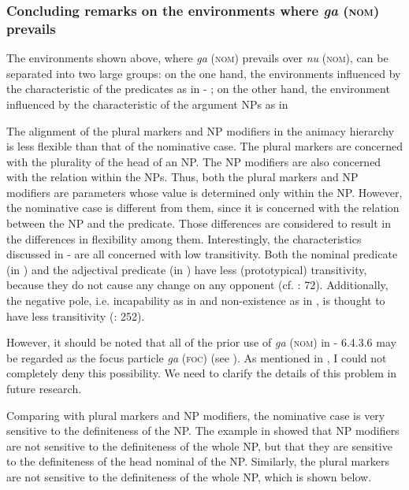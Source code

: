 \begin{styleBeschriftung}
\subsubsection{Concluding remarks on the environments where \textit{ga} (\textsc{nom}) prevails}

The environments shown above, where \textit{ga} (\textsc{nom}) prevails over \textit{nu} (\textsc{nom}), can be separated into two large groups: on the one hand, the environments influenced by the characteristic of the predicates as in  - ; on the other hand, the environment influenced by the characteristic of the argument NPs as in 

The alignment of the plural markers and NP modifiers in the animacy hierarchy is less flexible than that of the nominative case. The plural markers are concerned with the plurality of the head of an NP. The NP modifiers are also concerned with the relation within the NPs. Thus, both the plural markers and NP modifiers are parameters whose value is determined only within the NP. However, the nominative case is different from them, since it is concerned with the relation between the NP and the predicate. Those differences are considered to result in the differences in flexibility among them. Interestingly, the characteristics discussed in  -  are all concerned with low transitivity. Both the nominal predicate (in ) and the adjectival predicate (in ) have less (prototypical) transitivity, because they do not cause any change on any opponent (cf. \citealt{Tsunoda1991}: 72). Additionally, the negative pole, i.e. incapability as in  and non-existence as in , is thought to have less transitivity (\citealt{HopperThompson1980}: 252).

However, it should be noted that all of the prior use of \textit{ga} (\textsc{nom}) in  - 6.4.3.6 may be regarded as the focus particle \textit{ga} (\textsc{foc}) (see ). As mentioned in , I could not completely deny this possibility. We need to clarify the details of this problem in future research.

Comparing with plural markers and NP modifiers, the nominative case is very sensitive to the definiteness of the NP. The example  in  showed that NP modifiers are not sensitive to the definiteness of the whole NP, but that they are sensitive to the definiteness of the head nominal of the NP. Similarly, the plural markers are not sensitive to the definiteness of the whole NP, which is shown below.


\end{styleBeschriftung}

